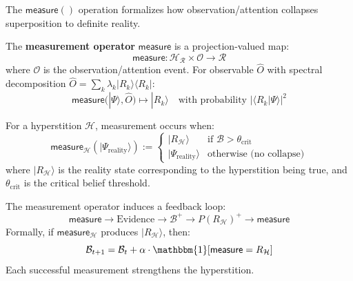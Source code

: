 The $\mathsf{measure}()$ operation formalizes how observation/attention collapses superposition to definite reality.

\begin{definition}
\label{def:measure-operator}
The \textbf{measurement operator} $\mathsf{measure}$ is a projection-valued map:
\begin{equation}
\boxed{
\mathsf{measure}: \mathcal{H}_{\mathcal{R}} \times \mathcal{O} \to \mathcal{R}
}
\end{equation}
where $\mathcal{O}$ is the observation/attention event. For observable $\hat{O}$ with spectral decomposition $\hat{O} = \sum_k \lambda_k |R_k\rangle\langle R_k|$:
\[
\mathsf{measure}(|\Psi\rangle, \hat{O}) \mapsto |R_k\rangle \quad \text{with probability } |\langle R_k|\Psi\rangle|^2
\]
\end{definition}

\begin{definition}
\label{def:hyperstition-measure}
For a hyperstition $\mathcal{H}$, measurement occurs when:
\begin{equation}
\boxed{
\mathsf{measure}_{\mathcal{H}}(|\Psi_{\text{reality}}\rangle) :=
\begin{cases}
|R_{\mathcal{H}}\rangle & \text{if } \mathcal{B} > \theta_{\text{crit}} \\
|\Psi_{\text{reality}}\rangle & \text{otherwise (no collapse)}
\end{cases}
}
\end{equation}
where $|R_{\mathcal{H}}\rangle$ is the reality state corresponding to the hyperstition being true, and $\theta_{\text{crit}}$ is the critical belief threshold.
\end{definition}

\begin{theorem}
\label{thm:measure-belief-feedback}
The measurement operator induces a feedback loop:
\[
\mathsf{measure} \to \text{Evidence} \to \mathcal{B}^+ \to P(R_{\mathcal{H}})^+ \to \mathsf{measure}
\]
Formally, if $\mathsf{measure}_{\mathcal{H}}$ produces $|R_{\mathcal{H}}\rangle$, then:
\[
\mathcal{B}_{t+1} = \mathcal{B}_t + \alpha \cdot \mathbbm{1}[\mathsf{measure} = R_{\mathcal{H}}]
\]
Each successful measurement strengthens the hyperstition.
\end{theorem}

